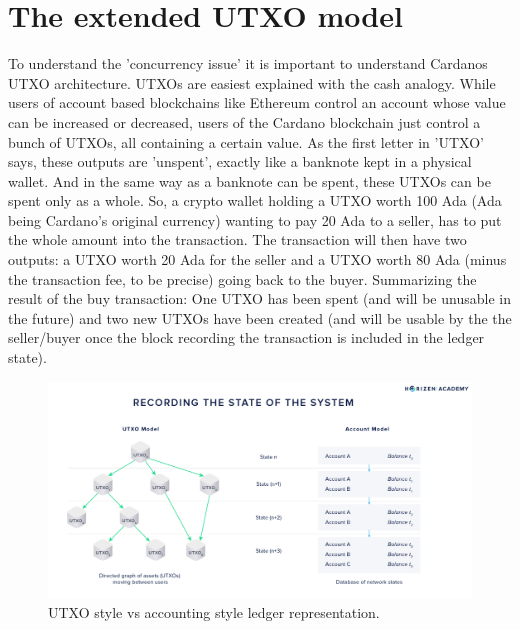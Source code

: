\documentclass[a4paper,twoside,12pt]{report}
\begin{document}
\section{The extended UTXO model}

To understand the 'concurrency issue' it is important to understand Cardanos UTXO architecture. UTXOs are easiest explained with the cash analogy. While users of account based blockchains like Ethereum control an account whose value can be increased or decreased, users of the Cardano blockchain just control a bunch of UTXOs, all containing a certain value. As the first letter in 'UTXO' says, these outputs are 'unspent', exactly like a banknote kept in a physical wallet. And in the same way as a banknote can be spent, these UTXOs can be spent only as a whole. So, a crypto wallet holding a UTXO worth 100 Ada (Ada being Cardano's original currency) wanting to pay 20 Ada to a seller, has to put the whole amount into the transaction. The transaction will then have two outputs: a UTXO worth 20 Ada for the seller and a UTXO worth 80 Ada (minus the transaction fee, to be precise) going back to the buyer. Summarizing the result of the buy transaction: One UTXO has been spent (and will be unusable in the future) and two new UTXOs have been created (and will be usable by the the seller/buyer once the block recording the transaction is included in the ledger state). 

\begin{figure}[h]
\centering
\includegraphics[scale=0.4]{UTXO_account_model}
\caption{UTXO style vs accounting style ledger representation.}
\end{figure}
\end{document}
